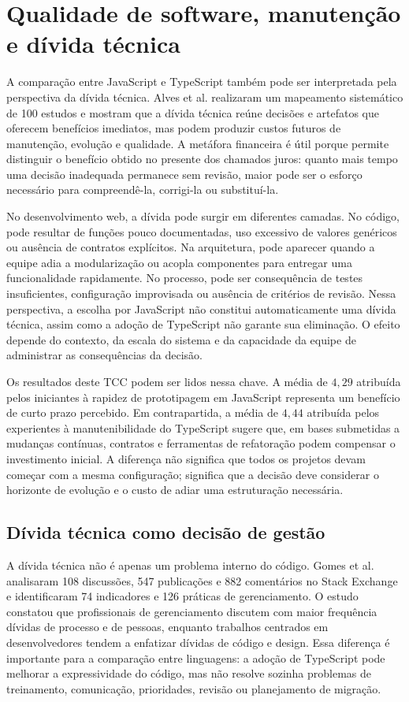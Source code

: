 \section{Qualidade de software, manutenção e dívida técnica}

A comparação entre JavaScript e TypeScript também pode ser interpretada pela perspectiva da dívida técnica. Alves et al. \cite{alves2016debt} realizaram um mapeamento sistemático de 100 estudos e mostram que a dívida técnica reúne decisões e artefatos que oferecem benefícios imediatos, mas podem produzir custos futuros de manutenção, evolução e qualidade. A metáfora financeira é útil porque permite distinguir o benefício obtido no presente dos chamados juros: quanto mais tempo uma decisão inadequada permanece sem revisão, maior pode ser o esforço necessário para compreendê-la, corrigi-la ou substituí-la.

No desenvolvimento web, a dívida pode surgir em diferentes camadas. No código, pode resultar de funções pouco documentadas, uso excessivo de valores genéricos ou ausência de contratos explícitos. Na arquitetura, pode aparecer quando a equipe adia a modularização ou acopla componentes para entregar uma funcionalidade rapidamente. No processo, pode ser consequência de testes insuficientes, configuração improvisada ou ausência de critérios de revisão. Nessa perspectiva, a escolha por JavaScript não constitui automaticamente uma dívida técnica, assim como a adoção de TypeScript não garante sua eliminação. O efeito depende do contexto, da escala do sistema e da capacidade da equipe de administrar as consequências da decisão.

Os resultados deste TCC podem ser lidos nessa chave. A média de $4,29$ atribuída pelos iniciantes à rapidez de prototipagem em JavaScript representa um benefício de curto prazo percebido. Em contrapartida, a média de $4,44$ atribuída pelos experientes à manutenibilidade do TypeScript sugere que, em bases submetidas a mudanças contínuas, contratos e ferramentas de refatoração podem compensar o investimento inicial. A diferença não significa que todos os projetos devam começar com a mesma configuração; significa que a decisão deve considerar o horizonte de evolução e o custo de adiar uma estruturação necessária.

\subsection{Dívida técnica como decisão de gestão}

A dívida técnica não é apenas um problema interno do código. Gomes et al. \cite{gomes2023debt} analisaram 108 discussões, 547 publicações e 882 comentários no Stack Exchange e identificaram 74 indicadores e 126 práticas de gerenciamento. O estudo constatou que profissionais de gerenciamento discutem com maior frequência dívidas de processo e de pessoas, enquanto trabalhos centrados em desenvolvedores tendem a enfatizar dívidas de código e design. Essa diferença é importante para a comparação entre linguagens: a adoção de TypeScript pode melhorar a expressividade do código, mas não resolve sozinha problemas de treinamento, comunicação, prioridades, revisão ou planejamento de migração.

